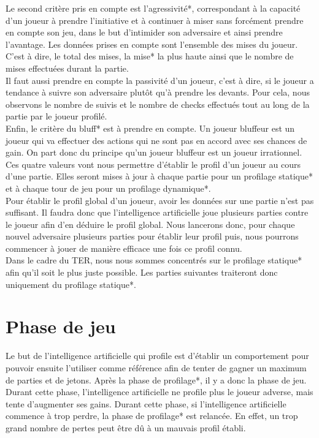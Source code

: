 \documentclass{report}
\begin{document}
Le second critère pris en compte est l'agressivité*, correspondant à la capacité d'un joueur à prendre l'initiative et à continuer à miser sans forcément prendre en compte son jeu, dans le but d'intimider son adversaire et ainsi prendre l'avantage. Les données prises en compte sont l'ensemble des mises du joueur. C'est à dire, le total des mises, la mise* la plus haute ainsi que le nombre de mises effectuées durant la partie. \\

Il faut aussi prendre en compte la passivité d'un joueur, c'est à dire, si le joueur a tendance à suivre son adversaire plutôt qu'à prendre les devants. Pour cela, nous observons le nombre de suivis et le nombre de checks effectués tout au long de la partie par le joueur profilé.\\

Enfin, le critère du bluff* est à prendre en compte. Un joueur bluffeur est un joueur qui va effectuer des actions qui ne sont pas en accord avec ses chances de gain. On part donc du principe qu'un joueur bluffeur est un joueur irrationnel.\\

Ces quatre valeurs vont nous permettre d'établir le profil d'un joueur au cours d'une partie. Elles seront mises à jour à chaque partie pour un profilage statique* et à chaque tour de jeu pour un profilage dynamique*. \\

Pour établir le profil global d'un joueur, avoir les données sur une partie n'est pas suffisant. Il faudra donc que l'intelligence artificielle joue plusieurs parties contre le joueur afin d'en déduire le profil global. Nous lancerons donc, pour chaque nouvel adversaire plusieurs parties pour établir leur profil puis, nous pourrons commencer à jouer de manière efficace une fois ce profil connu.\\

Dans le cadre du TER, nous nous sommes concentrés sur le profilage statique* afin qu'il soit le plus juste possible. Les parties suivantes traiteront donc uniquement du profilage statique*. \par


\section{Phase de jeu}

\hspace{0.5cm}Le but de l'intelligence artificielle qui profile est d'établir un comportement pour pouvoir ensuite l'utiliser comme référence afin de tenter de gagner un maximum de parties et de jetons. Après la phase de profilage*, il y a donc la phase de jeu. Durant cette phase, l'intelligence artificielle ne profile plus le joueur adverse, mais tente d'augmenter ses gains. Durant cette phase, si l'intelligence artificielle commence à trop perdre, la phase de profilage* est relancée. En effet, un trop grand nombre de pertes peut être dû à un mauvais profil établi. \\
\end{document}
